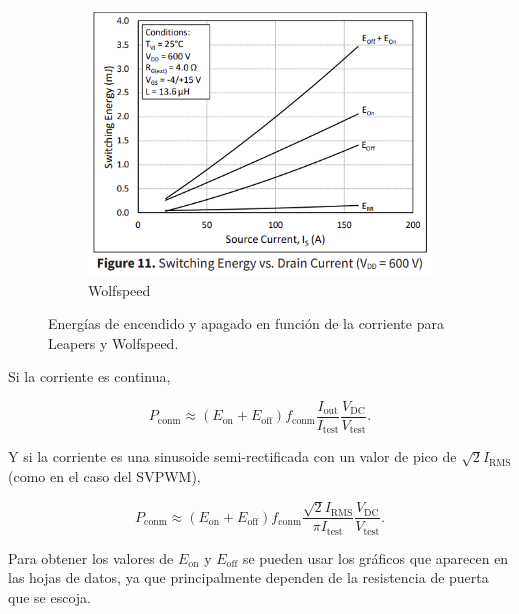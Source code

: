 \begin{figure}[H]
\begin{subfigure}[b]{0.55\linewidth}
		\includegraphics[width=\linewidth]{fig/eoneoffwolfspeed}
		\caption{Wolfspeed}
	\end{subfigure}
	\caption{Energías de encendido y apagado en función de la corriente para Leapers y Wolfspeed.}
\end{figure}

Si la corriente es continua,

\begin{equation}
P_{\text{conm}} \approx (E_{\text{on}} + E_{\text{off}}) f_{\text{conm}} \frac{I_{\text{out}}}{I_{\text{test}}} \frac{V_{\text{DC}}}{V_{\text{test}}} \text{.}
\end{equation}

Y si la corriente es una sinusoide semi-rectificada con un valor de pico de \(\sqrt{2} I_{\text{RMS}}\) (como en el caso del SVPWM), 

\begin{equation}
P_{\text{conm}} \approx (E_{\text{on}} + E_{\text{off}}) f_{\text{conm}} \frac{\sqrt{2} I_{\text{RMS}}}{\pi I_{\text{test}}} \frac{V_{\text{DC}}}{V_{\text{test}}}\text{.}
\end{equation}

Para obtener los valores de $E_{\text{on}}$ y $E_{\text{off}}$ se pueden usar los gráficos que aparecen en las hojas de datos, ya que principalmente dependen de la resistencia de puerta que se escoja.

